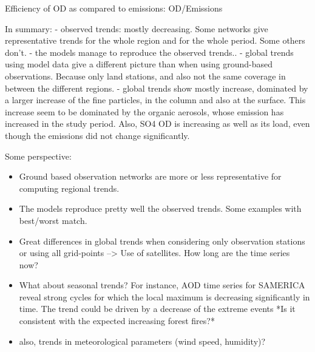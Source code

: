 \documentclass[journal abbreviation, manuscript]{copernicus}
\begin{document}
Efficiency of OD as compared to emissions: OD/Emissions




\conclusions  %
In summary:
- observed trends: mostly decreasing. Some networks give representative trends for the whole region and for the whole period. Some others don't.
- the models manage to reproduce the observed trends..
- global trends using model data give a different picture than when using ground-based observations. Because only land stations, and also not the same coverage in between the different regions.
- global trends show mostly increase, dominated by a larger increase of the fine particles, in the column and also at the surface. This increase seem to be dominated by the organic aerosols, whose emission has increased in the study period. Also, SO4 OD is increasing as well as its load, even though the emissions did not change significantly.

Some perspective:
\begin{itemize}
 \item Ground based observation networks are more or less representative for computing regional trends.
 \item The models reproduce pretty well the observed trends. Some examples with best/worst match.
 \item Great differences in global trends when considering only observation stations or using all grid-points --> Use of satellites. How long are the time series now?
 \item What about seasonal trends? For instance, AOD time series for SAMERICA reveal strong cycles for which the local maximum is decreasing significantly in time. The trend could be driven by a decrease of the extreme events *Is it consistent with the expected increasing forest fires?*
 \item also, trends in meteorological parameters (wind speed, humidity)?
\end{itemize}





\end{document}
